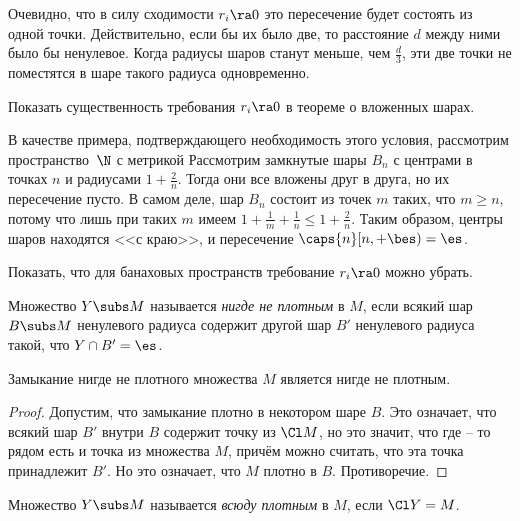 \documentclass[a4paper]{article}
\begin{document}
\begin{note}
Очевидно, что в силу сходимости $r_i \ra 0$ это пересечение будет состоять из одной точки.
Действительно, если бы их было две, то расстояние $d$ между ними было бы
ненулевое. Когда радиусы шаров станут меньше, чем $\frac d3$, эти две точки не поместятся
в шаре такого радиуса одновременно.
\end{note}

\begin{problem}
Показать существенность требования $r_i \ra 0$ в теореме о вложенных шарах.
\end{problem}
\begin{solution}
В качестве примера, подтверждающего необходимость этого условия, рассмотрим пространство~$\N$
с метрикой
Рассмотрим замкнутые шары  $B_n$ с центрами в точках $n$ и радиусами $1+\frac{2}{n}$. Тогда они все
вложены друг в друга, но их пересечение пусто. В самом деле, шар $B_n$ состоит из точек $m$ таких, что $m \ge n$,
потому что лишь при таких $m$ имеем $1 + \frac1m+\frac1n \le 1 + \frac2n$. Таким образом, центры шаров
находятся <<с краю>>, и пересечение $\caps{n}[n,+\bes)=\es$.
\end{solution}



\begin{problem}
Показать, что для банаховых пространств требование $r_i \ra 0$ можно убрать.
\end{problem}

\begin{df}
Множество $Y \subs M$ называется \emph{нигде не плотным} в $M$, если всякий шар $B \subs M$ ненулевого радиуса
содержит другой шар $B'$ ненулевого радиуса такой, что $Y \cap B' = \es$.
\end{df}

\begin{stm}
Замыкание нигде не плотного множества $M$ является нигде не плотным.
\end{stm}
\begin{proof}
Допустим, что замыкание плотно в некотором шаре $B$. Это означает,
что всякий шар $B'$ внутри $B$ содержит точку из $\Cl M$, но это значит, что где -- то рядом
есть и точка из множества $M$, причём можно считать, что эта точка принадлежит $B'$.
Но это означает, что $M$ плотно в $B$. Противоречие.
\end{proof}

\begin{df}
Множество $Y \subs M$ называется \emph{всюду плотным} в $M$, если $\Cl Y = M$.
\end{df}
\end{document}
